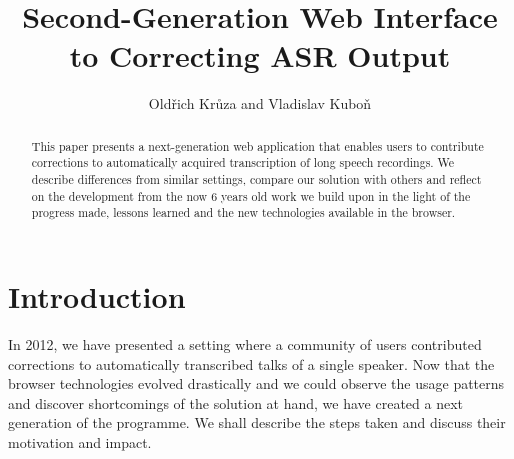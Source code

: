 \documentclass{svproc}
\begin{document}
\mainmatter              %
%
\title{Second-Generation Web Interface to Correcting ASR Output}
%
%
\author{Old\v{r}ich Kr\r{u}za and Vladislav Kubo\v{n}}
%
%
%

\maketitle              %

\begin{abstract}
This paper presents a next-generation web application that enables users to
contribute corrections to automatically acquired transcription of long speech
recordings. We describe differences from similar settings, compare our solution
with others and reflect on the development from the now 6 years old work we
build upon in the light of the progress made, lessons learned and the new
technologies available in the browser.
\end{abstract}

\section{Introduction}

In 2012\cite{kruuza2012making}, we have presented a setting where a community of
users contributed corrections to automatically transcribed talks of a single
speaker. Now that the browser technologies evolved drastically and we could
observe the usage patterns and discover shortcomings of the solution at hand, we
have created a next generation of the programme. We shall describe the steps
taken and discuss their motivation and impact.
\end{document}
